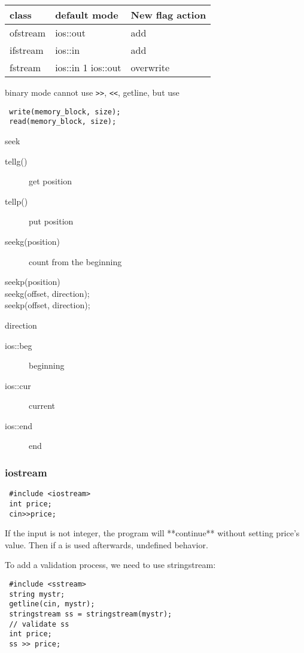 \begin{tabular}{lll}
  class & default mode & New flag action\\
  \hline
  ofstream & ios::out & add\\
  ifstream & ios::in & add\\
  fstream & ios::in 1 ios::out & overwrite\\
\end{tabular}

 binary mode cannot use \verb$>>$, \verb$<<$, getline, but use

\begin{lstlisting}
 write(memory_block, size);
 read(memory_block, size);
\end{lstlisting}

seek
\begin{description}
\item [tellg()] get position
\item [tellp()] put position
\item [seekg(position)] count from the beginning
\item [seekp(position)]
\item [seekg(offset, direction);]
\item [seekp(offset, direction);]
\end{description}

direction
\begin{description}
\item [ios::beg] beginning
\item [ios::cur] current
\item [ios::end] end
\end{description}
\subsubsection{iostream}

\begin{lstlisting}
 #include <iostream>
 int price;
 cin>>price;
\end{lstlisting}

If the input is not integer, the program will **continue** without
setting price's value.  Then if a is used afterwards, undefined
behavior.

To add a validation process, we need to use stringstream:

\begin{lstlisting}
 #include <sstream>
 string mystr;
 getline(cin, mystr);
 stringstream ss = stringstream(mystr);
 // validate ss
 int price;
 ss >> price;
\end{lstlisting}

